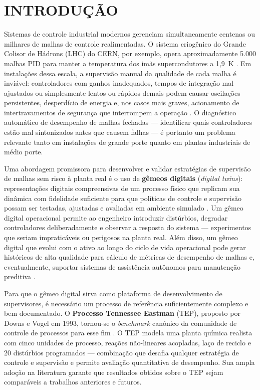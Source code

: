 \chapter[INTRODUÇÃO]{INTRODUÇÃO}

Sistemas de controle industrial modernos gerenciam simultaneamente centenas ou milhares de malhas de controle realimentadas. O sistema criogênico do Grande Colisor de Hádrons (LHC) do CERN, por exemplo, opera aproximadamente 5.000 malhas PID para manter a temperatura dos imãs supercondutores a 1,9~K \cite{Bradu2018}. Em instalações dessa escala, a supervisão manual da qualidade de cada malha é inviável: controladores com ganhos inadequados, tempos de integração mal ajustados ou simplesmente lentos ou rápidos demais podem causar oscilações persistentes, desperdício de energia e, nos casos mais graves, acionamento de intertravamentos de segurança que interrompem a operação \cite{Bradu2018}. O diagnóstico automático de desempenho de malhas fechadas — identificar quais controladores estão mal sintonizados antes que causem falhas — é portanto um problema relevante tanto em instalações de grande porte quanto em plantas industriais de médio porte.

Uma abordagem promissora para desenvolver e validar estratégias de supervisão de malhas sem risco à planta real é o uso de \textbf{gêmeos digitais} (\textit{digital twins}): representações digitais compreensivas de um processo físico que replicam sua dinâmica com fidelidade suficiente para que políticas de controle e supervisão possam ser testadas, ajustadas e avaliadas em ambiente simulado \cite{Boschert2016}. Um gêmeo digital operacional permite ao engenheiro introduzir distúrbios, degradar controladores deliberadamente e observar a resposta do sistema — experimentos que seriam impraticáveis ou perigosos na planta real. Além disso, um gêmeo digital que evolui com o ativo ao longo do ciclo de vida operacional pode gerar históricos de alta qualidade para cálculo de métricas de desempenho de malhas e, eventualmente, suportar sistemas de assistência autônomos para manutenção preditiva \cite{Boschert2016}.

Para que o gêmeo digital sirva como plataforma de desenvolvimento de supervisores, é necessário um processo de referência suficientemente complexo e bem documentado. O \textbf{Processo Tennessee Eastman} (TEP), proposto por Downs e Vogel em 1993, tornou-se o \textit{benchmark} canônico da comunidade de controle de processos para esse fim \cite{DOWNS1993}. O TEP modela uma planta química realista com cinco unidades de processo, reações não-lineares acopladas, laço de reciclo e 20 distúrbios programados — combinação que desafia qualquer estratégia de controle e supervisão e permite avaliação quantitativa de desempenho. Sua ampla adoção na literatura garante que resultados obtidos sobre o TEP sejam comparáveis a trabalhos anteriores e futuros.

